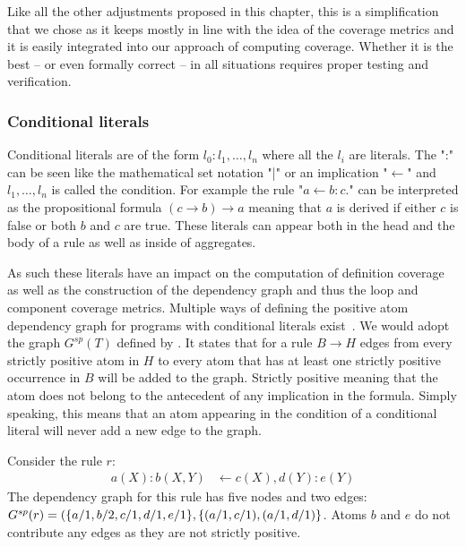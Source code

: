 Like all the other adjustments proposed in this chapter, this is a simplification that we chose as it keeps mostly in line with the idea of the coverage metrics and it is easily integrated into our approach of computing coverage. Whether it is the best -- or even formally correct -- in all situations requires proper testing and verification.


\subsubsection{Conditional literals}
\label{subsubsec:Coverage for further program classes/Language constructs/Conditional literals}
Conditional literals are of the form \(l_0 : l_1, \ldots, l_n\) where all the \(l_i\) are literals. The ":" can be seen like the mathematical set notation "|" or an implication "$\leftarrow$" and \(l_1, \ldots, l_n\) is called the condition. For example the rule "\(a \leftarrow b : c.\)" can be interpreted as the propositional formula \((c \rightarrow b) \rightarrow a\) meaning that $a$ is derived if either $c$ is false or both $b$ and $c$ are true. These literals can appear both in the head and the body of a rule as well as inside of aggregates.

As such these literals have an impact on the computation of definition coverage as well as the construction of the dependency graph and thus the loop and component coverage metrics. Multiple ways of defining the positive atom dependency graph for programs with conditional literals exist~\cite{FLL06, FL22}. We would adopt the graph \(G^{sp}(T)\) defined by \textcite{FL22}. It states that for a rule \(B \rightarrow H\) edges from every strictly positive atom in $H$ to every atom that has at least one strictly positive occurrence in $B$ will be added to the graph. Strictly positive meaning that the atom does not belong to the antecedent of any implication in the formula. Simply speaking, this means that an atom appearing in the condition of a conditional literal will never add a new edge to the graph.

\begin{example}
\label{ex:conditional literals}
    Consider the rule $r$:
    \begin{align*}
        a(X) : b(X, Y) &\leftarrow c(X), d(Y) : e(Y)
    \end{align*}
    The dependency graph for this rule has five nodes and two edges: \(G^{sp}(r) = (\{a/1, b/2, \\ c/1, d/1, e/1\}, \{(a/1, c/1), (a/1, d/1)\}\). Atoms $b$ and $e$ do not contribute any edges as they are not strictly positive.
\end{example}

